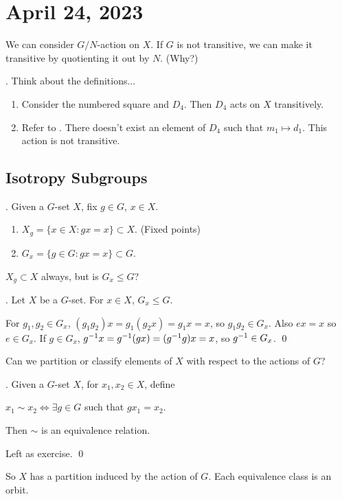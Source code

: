 \section*{April 24, 2023}

We can consider \(G/N\)-action on \(X\). If \(G\) is not transitive, we can make it transitive by quotienting it out by \(N\). (Why?)

\ex. Think about the definitions...
\begin{enumerate}
    \item Consider the numbered square and \(D_4\). Then \(D_4\) acts on \(X\) transitively.
    \item Refer to . There doesn't exist an element of \(D_4\) such that \(m_1 \mapsto d_1\). This action is not transitive.
\end{enumerate}

\subsection*{Isotropy Subgroups}

. Given a \(G\)-set \(X\), fix \(g \in G\), \(x \in X\).
\begin{enumerate}
    \item \(X_g = \{x \in X : gx = x\} \subset X\). (Fixed points)
    \item {} \(G_x = \{g \in G : gx = x\} \subset G\).
\end{enumerate}

\(X_g \subset X\) always, but is \(G_x \leq G\)?

\thm. Let \(X\) be a \(G\)-set. For \(x \in X\), \(G_x \leq G\).

\pf For \(g_1, g_2 \in G_x\), \((g_1 g_2) x = g_1 (g_2 x) = g_1 x = x\), so \(g_1 g_2 \in G_x\). Also \(ex = x\) so \(e \in G_x\). If \(g \in G_x\), \(g^{-1} x = g^{-1} (gx) = (g^{-1} g)x = x\), so \(g^{-1} \in G_x\). \qed

Can we partition or classify elements of \(X\) with respect to the actions of \(G\)?

\thm. Given a \(G\)-set \(X\), for \(x_1, x_2 \in X\), define
\begin{center}
    \(x_1 \sim x_2 \iff \exists g \in G\) such that \(gx_1 = x_2\).
\end{center}
Then \(\sim\) is an equivalence relation.

\pf Left as exercise. \qed

So \(X\) has a partition induced by the action of \(G\). Each equivalence class is an orbit.


